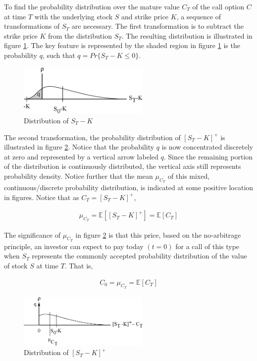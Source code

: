 To find the probability distribution over the mature value $C_T$ of the call option $C$ at time $T$ with the underlying stock $S$ and strike price $K$, a sequence of transformations of $S_T$ are necessary. The first transformation is to subtract the strike price $K$ from the distribution $S_T$. The resulting distribution is illustrated in figure \ref{fig:S_T_minus_K}. The key feature is represented by the shaded region in figure \ref{fig:S_T_minus_K} is the probability $q$, such that $q = Pr\{S_T - K \le 0\}$. 

\begin{figure}
  \centering
  \includegraphics[width=2.5in]{Images/S_T_minus_K.eps}
  \caption[Distribution of $S_T$ Minus Strike Price $K$]
          {Distribution of $S_T - K$}
  \label{fig:S_T_minus_K}
\end{figure}

The second transformation, the probability distribution of $[S_T - K]^+$ is illustrated in figure \ref{fig:S_T_minus_K_plus}. Notice that the probability $q$ is now concentrated discretely at zero and represented by a vertical arrow labeled $q$. Since the remaining portion of the distribution is continuously distributed, the vertical axis still represents probability density. Notice further that the mean $\mu_{C_T}$ of this mixed, continuous/discrete probability distribution, is indicated at some positive location in figures. Notice that as $C_T = [S_T - K]^+$,

\begin{align*}
\mu_{C_T} = \mathbb{E}[[S_T - K]^+] = \mathbb{E}[C_T]
\end{align*}

The significance of $\mu_{C_T}$ in figure \ref{fig:S_T_minus_K_plus} is that this price, based on the no-arbitrage principle, an investor can expect to pay today $(t = 0)$ for a call of this type when $S_T$ represents the commonly accepted probability distribution of the value of stock $S$ at time $T$. That is,

\begin{align*}
C_0 = \mu_{C_T} = \mathbb{E}[C_T]
\end{align*}

\begin{figure}
  \centering
  \includegraphics[width=2.5in]{Images/S_T_minus_K_plus.eps}
  \caption[Distribution of Positive Portion of $S_T$ Minus Strike Price $K$]
          {Distribution of $[S_T - K]^+$}
  \label{fig:S_T_minus_K_plus}
\end{figure}

